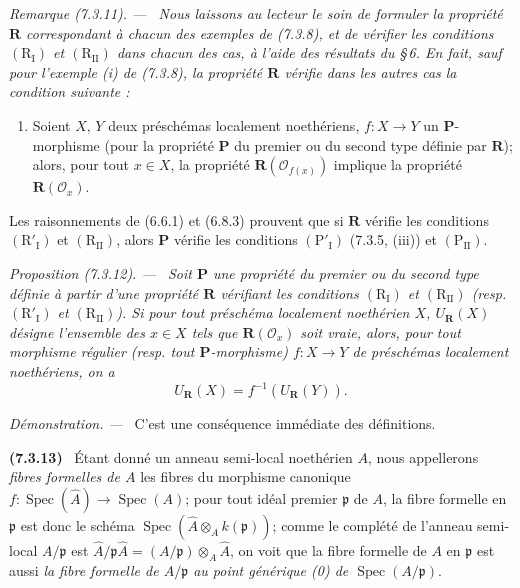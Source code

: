 \documentclass[10pt,oneside]{book}
\newenvironment{env}[1][]{\par\medskip\noindent\textbf{(#1)}\ }{\par}
\newenvironment{proposition}[1][]{%
  \par\medskip\noindent\itshape Proposition (#1). ---\ }{\par}
\newenvironment{remark}[1][]{%
  \par\medskip\noindent\itshape Remarque (#1). ---\ }{\par}
\newenvironment{proof}{%
  \par\medskip\noindent\textit{Démonstration. ---\ }}{\par}
\begin{document}
\begin{remark}[7.3.11]
\label{IV.2.s7.3.11-fr}
Nous laissons au lecteur le soin de formuler la propriété $\boldsymbol R$
correspondant à chacun des exemples de (7.3.8), et de vérifier les
conditions $(\mathrm R_{\mathrm I})$ et $(\mathrm R_{\mathrm{II}})$ dans
chacun des cas, à l'aide des résultats du \S\,6. En fait, sauf pour
l'exemple (i) de (7.3.8), la propriété $\boldsymbol R$ vérifie dans les
autres cas la condition suivante :
\begin{enumerate}
\item[$(\mathrm R'_{\mathrm I})$] Soient $X$, $Y$ deux préschémas
localement noethériens, $f:X\to Y$ un $\boldsymbol P$-morphisme (pour la
propriété $\boldsymbol P$ du premier ou du second type définie par
$\boldsymbol R$); alors, pour tout $x\in X$, la propriété
$\boldsymbol R(\mathscr O_{f(x)})$ implique la propriété
$\boldsymbol R(\mathscr O_x)$.
\end{enumerate}
Les raisonnements de (6.6.1) et (6.8.3) prouvent que si
$\boldsymbol R$ vérifie les conditions $(\mathrm R'_{\mathrm I})$ et
$(\mathrm R_{\mathrm{II}})$, alors $\boldsymbol P$ vérifie les conditions
$(\mathrm P'_{\mathrm I})$ (7.3.5, (iii)) et
$(\mathrm P_{\mathrm{II}})$.
\end{remark}

\begin{proposition}[7.3.12]
\label{IV.2.s7.3.12-fr}
Soit $\boldsymbol P$ une propriété du premier ou du second type définie à
partir d'une propriété $\boldsymbol R$ vérifiant les conditions
$(\mathrm R_{\mathrm I})$ et $(\mathrm R_{\mathrm{II}})$ (resp.
$(\mathrm R'_{\mathrm I})$ et $(\mathrm R_{\mathrm{II}})$). Si pour tout
préschéma localement noethérien $X$, $U_{\boldsymbol R}(X)$ désigne
l'ensemble des $x\in X$ tels que $\boldsymbol R(\mathscr O_x)$ soit vraie,
alors, pour tout morphisme régulier (resp. tout
$\boldsymbol P$-morphisme) $f:X\to Y$ de préschémas localement
noethériens, on a
\begin{equation}
U_{\boldsymbol R}(X)=f^{-1}(U_{\boldsymbol R}(Y)).
\tag{7.3.12.1}
\label{IV.2.eq.7.3.12.1-fr}
\end{equation}
\end{proposition}

\begin{proof}
C'est une conséquence immédiate des définitions.
\end{proof}

\begin{env}[7.3.13]
\label{IV.2.s7.3.13-fr}
Étant donné un anneau semi-local noethérien $A$, nous appellerons
\emph{fibres formelles de $A$} les fibres du morphisme canonique
$f:\operatorname{Spec}(\widehat A)\to\operatorname{Spec}(A)$; pour tout
idéal premier $\mathfrak p$ de $A$, la fibre formelle en $\mathfrak p$ est
donc le schéma
$\operatorname{Spec}(\widehat A\otimes_A k(\mathfrak p))$; comme le
complété de l'anneau semi-local $A/\mathfrak p$ est
$\widehat A/\mathfrak p\widehat A=(A/\mathfrak p)\otimes_A\widehat A$, on
voit que la fibre formelle de $A$ en $\mathfrak p$ est aussi \emph{la
fibre formelle de $A/\mathfrak p$ au point générique (0) de
$\operatorname{Spec}(A/\mathfrak p)$}.
\end{env}
\end{document}
